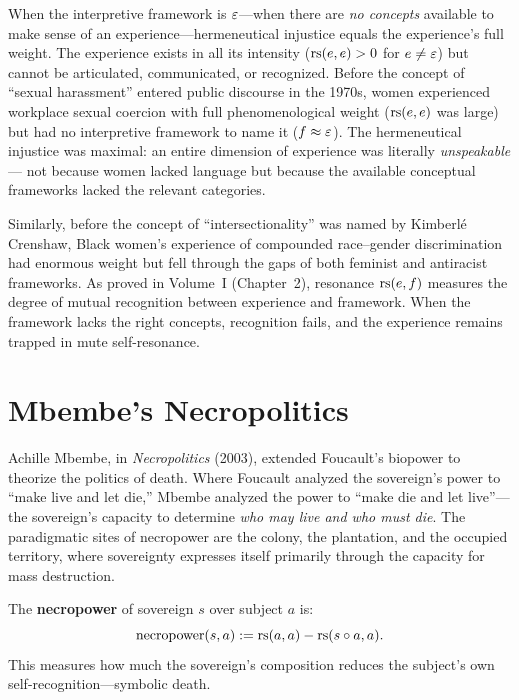 \begin{interpretation}
When the interpretive framework is $\varepsilon$---when there are \emph{no concepts}
available to make sense of an experience---hermeneutical injustice equals the
experience's full weight. The experience exists in all its intensity
($\mathrm{rs}(e,e) > 0$ for $e \neq \varepsilon$) but cannot be articulated, communicated,
or recognized. Before the concept of ``sexual harassment'' entered public
discourse in the 1970s, women experienced workplace sexual coercion with full
phenomenological weight ($\mathrm{rs}(e,e)$ was large) but had no interpretive
framework to name it ($f \approx \varepsilon$). The hermeneutical injustice was
maximal: an entire dimension of experience was literally \emph{unspeakable}---
not because women lacked language but because the available conceptual
frameworks lacked the relevant categories.

Similarly, before the concept of ``intersectionality'' was named by Kimberlé
Crenshaw, Black women's experience of compounded race--gender discrimination
had enormous weight but fell through the gaps of both feminist and antiracist
frameworks. As proved in Volume~I (Chapter~2), resonance $\mathrm{rs}(e, f)$ measures
the degree of mutual recognition between experience and framework. When the
framework lacks the right concepts, recognition fails, and the experience
remains trapped in mute self-resonance.
\end{interpretation}

\section{Mbembe's Necropolitics}

Achille Mbembe, in \emph{Necropolitics} (2003), extended Foucault's biopower
to theorize the politics of death. Where Foucault analyzed the sovereign's
power to ``make live and let die,'' Mbembe analyzed the power to ``make die
and let live''---the sovereign's capacity to determine \emph{who may live and
who must die}. The paradigmatic sites of necropower are the colony, the
plantation, and the occupied territory, where sovereignty expresses itself
primarily through the capacity for mass destruction.

\begin{definition}[Necropower]
\label{def:necropower}
The \textbf{necropower} of sovereign $s$ over subject $a$ is:
\[
  \mathrm{necropower}(s, a) := \mathrm{rs}(a, a) - \mathrm{rs}(s \circ a, a).
\]
This measures how much the sovereign's composition reduces the subject's
own self-recognition---symbolic death.
\end{definition}


